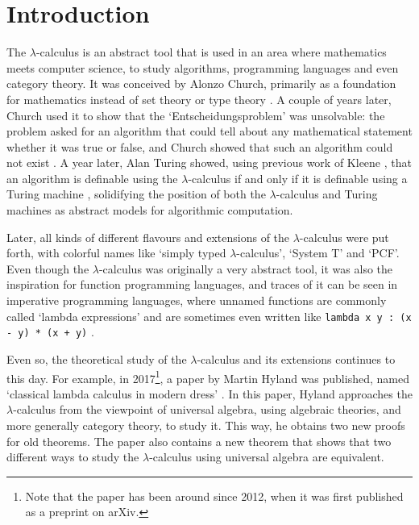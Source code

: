 \chapter{Introduction}

The $ \lambda $-calculus is an abstract tool that is used in an area where mathematics meets computer science, to study algorithms, programming languages and even category theory. It was conceived by Alonzo Church, primarily as a foundation for mathematics instead of set theory or type theory \autocite{church-lambda-calculus}. A couple of years later, Church used it to show that the `Entscheidungsproblem' was unsolvable: the problem asked for an algorithm that could tell about any mathematical statement whether it was true or false, and Church showed that such an algorithm could not exist \autocite{church-number-theory}. A year later, Alan Turing showed, using previous work of Kleene \autocite{kleene-lambda}, that an algorithm is definable using the $ \lambda $-calculus if and only if it is definable using a Turing machine \autocite{turing-lambda}, solidifying the position of both the $ \lambda $-calculus and Turing machines as abstract models for algorithmic computation.

Later, all kinds of different flavours and extensions of the $ \lambda $-calculus were put forth, with colorful names like `simply typed $ \lambda $-calculus', `System T' and `PCF'. Even though the $ \lambda $-calculus was originally a very abstract tool, it was also the inspiration for function programming languages, and traces of it can be seen in imperative programming languages, where unnamed functions are commonly called `lambda expressions' \autocite{java-lambdas} and are sometimes even written like \texttt{lambda x y : (x - y) * (x + y)} \autocite{python-expressions}.

Even so, the theoretical study of the $ \lambda $-calculus and its extensions continues to this day. For example, in 2017\footnote{Note that the paper has been around since 2012, when it was first published as a preprint on arXiv.}, a paper by Martin Hyland was published, named `classical lambda calculus in modern dress' \autocite{Hyland}. In this paper, Hyland approaches the $ \lambda $-calculus from the viewpoint of universal algebra, using algebraic theories, and more generally category theory, to study it. This way, he obtains two new proofs for old theorems. The paper also contains a new theorem that shows that two different ways to study the $ \lambda $-calculus using universal algebra are equivalent.

